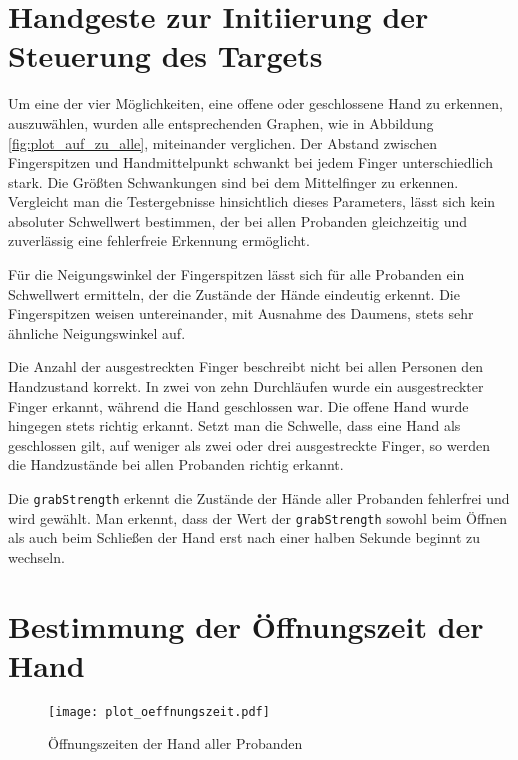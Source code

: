 \section{Handgeste zur Initiierung der Steuerung des Targets}



Um eine der vier Möglichkeiten, eine offene oder geschlossene Hand zu erkennen, auszuwählen, wurden alle entsprechenden Graphen, wie in Abbildung \ref{fig:plot_auf_zu_alle}, miteinander verglichen. Der Abstand zwischen Fingerspitzen und Handmittelpunkt schwankt bei jedem Finger unterschiedlich stark. Die Größten Schwankungen sind bei dem Mittelfinger zu erkennen. Vergleicht man die Testergebnisse hinsichtlich dieses Parameters, lässt sich kein absoluter Schwellwert bestimmen, der bei allen Probanden gleichzeitig und zuverlässig eine fehlerfreie Erkennung ermöglicht. 

Für die Neigungswinkel der Fingerspitzen lässt sich für alle Probanden ein Schwellwert ermitteln, der die Zustände der Hände eindeutig erkennt. Die Fingerspitzen weisen untereinander, mit Ausnahme des Daumens, stets sehr ähnliche Neigungswinkel auf. 

Die Anzahl der ausgestreckten Finger beschreibt nicht bei allen Personen den Handzustand korrekt. In zwei von zehn Durchläufen wurde ein ausgestreckter Finger erkannt, während die Hand geschlossen war. Die offene Hand wurde hingegen stets richtig erkannt. Setzt man die Schwelle, dass eine Hand als geschlossen gilt, auf weniger als zwei oder drei ausgestreckte Finger, so werden die Handzustände bei allen Probanden richtig erkannt.



Die \texttt{grabStrength} erkennt die Zustände der Hände aller Probanden fehlerfrei und wird gewählt. Man erkennt, dass der Wert der \texttt{grabStrength} sowohl beim Öffnen als auch beim Schließen der Hand erst nach einer halben Sekunde beginnt zu wechseln.



\section{Bestimmung der Öffnungszeit der Hand}

\begin{figure}[htb]
	\centering
	\texttt{[image: plot\_oeffnungszeit.pdf]}
	\caption{Öffnungszeiten der Hand aller Probanden}
	\label{fig:Plot Öffnungszeit}
\end{figure}

